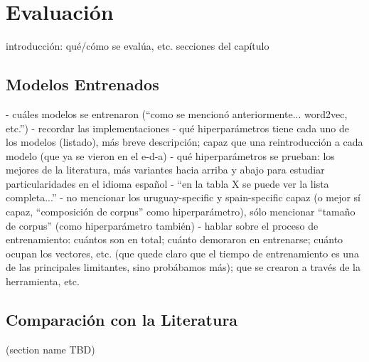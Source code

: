 \chapter{Evaluación}

introducción: qué/cómo se evalúa, etc.
secciones del capítulo


\section{Modelos Entrenados}

- cuáles modelos se entrenaron (``como se mencionó anteriormente... word2vec, etc.'')
- recordar las implementaciones
- qué hiperparámetros tiene cada uno de los modelos (listado), más breve descripción; capaz que una reintroducción a cada modelo (que ya se vieron en el e-d-a)
- qué hiperparámetros se prueban: los mejores de la literatura, más variantes hacia arriba y abajo para estudiar particularidades en el idioma español
- ``en la tabla X se puede ver la lista completa...''
    - no mencionar los uruguay-specific y spain-specific capaz (o mejor sí capaz, ``composición de corpus'' como hiperparámetro), sólo mencionar ``tamaño de corpus'' (como hiperparámetro también)
- hablar sobre el proceso de entrenamiento: cuántos son en total; cuánto demoraron en entrenarse; cuánto ocupan los vectores, etc. (que quede claro que el tiempo de entrenamiento es una de las principales limitantes, sino probábamos más); que se crearon a través de la herramienta, etc.


\section{Comparación con la Literatura}
(section name TBD)

